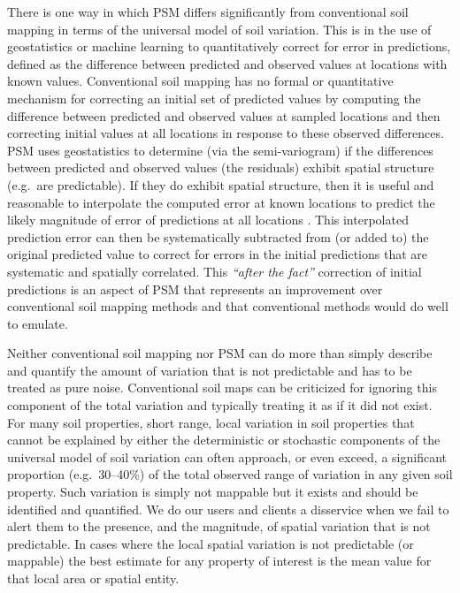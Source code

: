\documentclass[graybox,natbib,nospthms,UStrade]{svmono}
\begin{document}
There is one way in which PSM differs significantly from
conventional soil mapping in terms of the universal model of soil
variation. This is in the use of geostatistics or machine learning to
quantitatively correct for error in predictions, defined as the
difference between predicted and observed values at locations with known
values. Conventional soil mapping has no formal or quantitative
mechanism for correcting an initial set of predicted values by computing
the difference between predicted and observed values at sampled
locations and then correcting initial values at all locations in
response to these observed differences. PSM uses
geostatistics to determine (via the semi-variogram) if the differences between predicted and
observed values (the residuals) exhibit spatial structure (e.g.~are
predictable). If they do exhibit spatial structure, then it is useful
and reasonable to interpolate the computed error at known locations to
predict the likely magnitude of error of predictions at all locations
\citep{hengl2007regression}. This interpolated prediction error can then be
systematically subtracted from (or added to) the original predicted
value to correct for errors in the initial predictions that are
systematic and spatially correlated. This \emph{``after the fact''} correction
of initial predictions is an aspect of PSM that
represents an improvement over conventional soil mapping methods and
that conventional methods would do well to emulate.

Neither conventional soil mapping nor PSM can do more
than simply describe and quantify the amount of variation that is not
predictable and has to be treated as pure noise. Conventional soil maps
can be criticized for ignoring this component of the total variation and
typically treating it as if it did not exist. For many soil properties,
short range, local variation in soil properties that cannot be explained
by either the deterministic or stochastic components of the universal
model of soil variation can often approach, or even exceed, a significant proportion (e.g.~30--40\%) of the
total observed range of variation in any given soil property. Such
variation is simply not mappable but it exists and should be identified
and quantified. We do our users and clients a disservice when we fail to
alert them to the presence, and the magnitude, of spatial variation that
is not predictable. In cases where the local spatial variation is not
predictable (or mappable) the best estimate for any property of interest
is the mean value for that local area or spatial entity.
\end{document}
